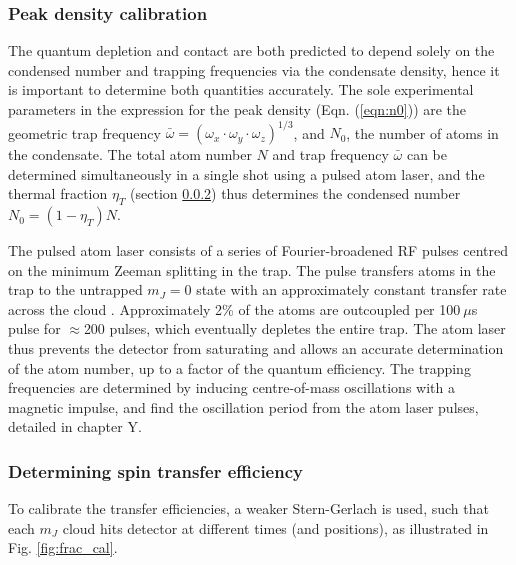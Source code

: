\subsubsection{Peak density calibration}

    The quantum depletion and contact are both predicted to depend solely on the condensed number and trapping frequencies via the condensate density, hence it is important to determine both quantities accurately. 
    The sole experimental parameters in the expression for the peak density (Eqn. (\ref{eqn:n0})) are the geometric trap frequency $\bar{\omega} = \left(\omega_x\cdot\omega_y\cdot\omega_z\right)^{1/3}$, and $N_0$, the number of atoms in the condensate. 
    The total atom number $N$ and trap frequency $\bar{\omega}$ can be determined simultaneously in a single shot using a pulsed atom laser, and the thermal fraction $\eta_T$ (section \ref{sec:th_spin}) thus determines the condensed number $N_0 = (1-\eta_T)N$. 

	The pulsed atom laser consists of a series of Fourier-broadened RF pulses centred on the minimum Zeeman splitting in the trap. 
	The pulse transfers atoms in the trap to the untrapped $m_J=0$ state with an approximately constant transfer rate across the cloud \cite{Manning10,Henson18}. 
	Approximately 2\% of the atoms are outcoupled per 100$~\mu$s pulse for $\approx$200 pulses, which eventually depletes the entire trap. 
	The atom laser thus prevents the detector from saturating and allows an accurate determination of the atom number, up to a factor of the quantum efficiency. 
	The trapping frequencies are determined by inducing centre-of-mass oscillations with a magnetic impulse, and find the oscillation period from the atom laser pulses, detailed in chapter Y.


\subsubsection{Determining spin transfer efficiency}
\label{sec:th_spin}

	To calibrate the transfer efficiencies, a weaker Stern-Gerlach is used, such that each $m_J$ cloud hits detector at different times (and positions), as illustrated in Fig. \ref{fig:frac_cal}. 

